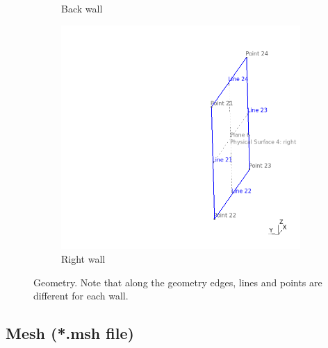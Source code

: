 \documentclass[a4]{article}
\begin{document}
\begin{figure}
\begin{subfigure}[b]{0.48\textwidth}
    \caption{Back wall}
    \label{fig:g3}
  \end{subfigure}
  \hfill
  \begin{subfigure}[b]{0.48\textwidth}
    \centering
    \includegraphics[width=\textwidth]{geometry_4.png}
    \caption{Right wall}
    \label{fig:g5}
  \end{subfigure}  
  \caption{Geometry. Note that along the geometry edges, lines and points are different for each wall.}
  \label{fig:geometry_partition}
\end{figure}

\subsection{Mesh (*.msh file)}
\end{document}
